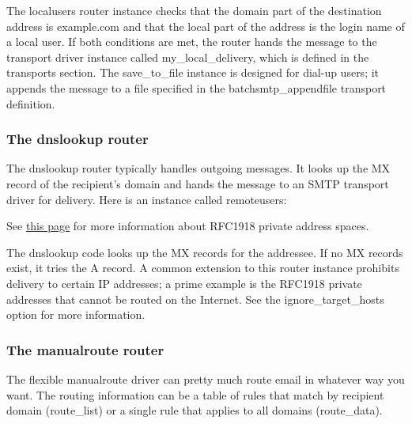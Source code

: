 
The {localusers} router instance checks that the domain part of the
destination address is example.com and that the local part of the
address is the login name of a local user. If both conditions are met,
the router hands the message to the transport driver instance called
{my\_local\_delivery}, which is defined in the {transports} section. The
{save\_to\_file} instance is designed for dial-up users; it appends the
message to a file specified in the {batchsmtp\_appendfile} transport
definition.

\subsubsection[The {dnslookup}
router]{\texorpdfstring{\protect\hypertarget{part0026_split_050.htmlux5cux23_idTextAnchor1150}{}{}The
{dnslookup} router}{The dnslookup router}}

The
\protect\hypertarget{part0026_split_050.htmlux5cux23_idIndexMarker2656}{}{}{dnslookup}
router typically handles outgoing messages. It looks up the MX record of
the recipient's domain and hands the message to an SMTP transport driver
for delivery. Here is an instance called {remoteusers}:


\leavevmode\hypertarget{part0026_split_050.htmlux5cux23_idContainer1200}{}%
See
\protect\hyperlink{part0021_split_021.htmlux5cux23_idTextAnchor657}{this
page} for more information about RFC1918 private address spaces.

The {dnslookup} code looks up the
\protect\hypertarget{part0026_split_050.htmlux5cux23_idIndexMarker2657}{}{}MX
records for the addressee. If no MX records exist, it tries the A
record. A common extension to this router instance prohibits delivery to
certain IP addresses; a prime example is the RFC1918 private addresses
that cannot be routed on the Internet. See the {ignore\_target\_hosts}
option for more information.

\subsubsection[The {manualroute}
router]{\texorpdfstring{\protect\hypertarget{part0026_split_050.htmlux5cux23_idTextAnchor1151}{}{}The
{manualroute} router}{The manualroute router}}

The flexible
\protect\hypertarget{part0026_split_050.htmlux5cux23_idIndexMarker2658}{}{}{manualroute}
driver can pretty much route email in whatever way you want. The routing
information can be a table of rules that match by recipient domain
({route\_list}) or a single rule that applies to all domains
({route\_data}).

